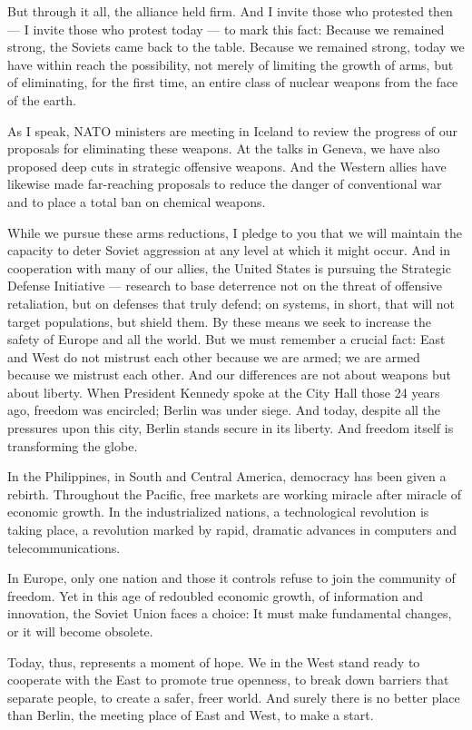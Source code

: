 \documentclass[a4paper]{amsbook}
\begin{document}
But through it all, the alliance held firm. And I invite those who protested then — I invite those who protest today — to mark this fact: Because we remained strong, the Soviets came back to the table. Because we remained strong, today we have within reach the possibility, not merely of limiting the growth of arms, but of eliminating, for the first time, an entire class of nuclear weapons from the face of the earth.

As I speak, NATO ministers are meeting in Iceland to review the progress of our proposals for eliminating these weapons. At the talks in Geneva, we have also proposed deep cuts in strategic offensive weapons. And the Western allies have likewise made far-reaching proposals to reduce the danger of conventional war and to place a total ban on chemical weapons.

While we pursue these arms reductions, I pledge to you that we will maintain the capacity to deter Soviet aggression at any level at which it might occur. And in cooperation with many of our allies, the United States is pursuing the Strategic Defense Initiative — research to base deterrence not on the threat of offensive retaliation, but on defenses that truly defend; on systems, in short, that will not target populations, but shield them. By these means we seek to increase the safety of Europe and all the world. But we must remember a crucial fact: East and West do not mistrust each other because we are armed; we are armed because we mistrust each other. And our differences are not about weapons but about liberty. When President Kennedy spoke at the City Hall those 24 years ago, freedom was encircled; Berlin was under siege. And today, despite all the pressures upon this city, Berlin stands secure in its liberty. And freedom itself is transforming the globe.

In the Philippines, in South and Central America, democracy has been given a rebirth. Throughout the Pacific, free markets are working miracle after miracle of economic growth. In the industrialized nations, a technological revolution is taking place, a revolution marked by rapid, dramatic advances in computers and telecommunications.

In Europe, only one nation and those it controls refuse to join the community of freedom. Yet in this age of redoubled economic growth, of information and innovation, the Soviet Union faces a choice: It must make fundamental changes, or it will become obsolete.

Today, thus, represents a moment of hope. We in the West stand ready to cooperate with the East to promote true openness, to break down barriers that separate people, to create a safer, freer world. And surely there is no better place than Berlin, the meeting place of East and West, to make a start.
\end{document}

